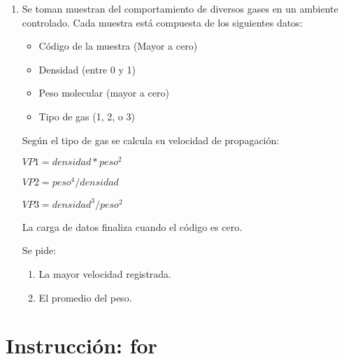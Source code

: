 \begin{enumerate}[resume]
    \item Se toman muestran del comportamiento de diversos gases en un ambiente controlado. Cada muestra está compuesta de los siguientes datos:
	    \begin{itemize}
            \item Código de la muestra (Mayor a cero)
            \item Densidad (entre 0 y 1)
            \item Peso molecular (mayor a cero)
            \item Tipo de gas (1, 2, o 3)
        \end{itemize}
        Según el tipo de gas se calcula su velocidad de propagación:
            
            $VP1 = densidad *  peso^2 $ 
            
            $VP2 =  peso^4 / densidad $

            $VP3 = densidad^3 / peso^2 $
 
            La carga de datos finaliza cuando el código es cero.
            
            Se pide:
            \begin{enumerate}
            	\item La mayor velocidad registrada.
            	\item El promedio del peso.
			\end{enumerate}


\end{enumerate}





\section{Instrucción: for}

